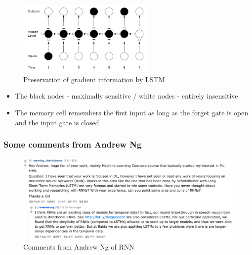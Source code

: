 \documentclass{beamer}
\begin{document}
\frame
{
		\begin{figure}[ht]  
			\begin{center}
				\includegraphics[width=2.6in]{Images/LSTM_preserving_gradient.png}   
			\end{center}   
			\caption{\centering Preservation of gradient information by LSTM}
		\end{figure}
		\vspace{-0.5cm}
		\begin{itemize}
			\item The black nodes - maximally sensitive / white nodes - entirely insensitive
			\item The memory cell remembers the first input as long as the forget gate is open and the input gate is closed
		\end{itemize}
}
\frame
{
  \frametitle{Some comments from Andrew Ng}
   \begin{figure}[ht]  
		\begin{center}
			\includegraphics[width=4.5in]{Images/comment_rnn_ng.png}   
		\end{center}   
		\caption{Comments from Andrew Ng of RNN}
	\end{figure}
}
\end{document}
